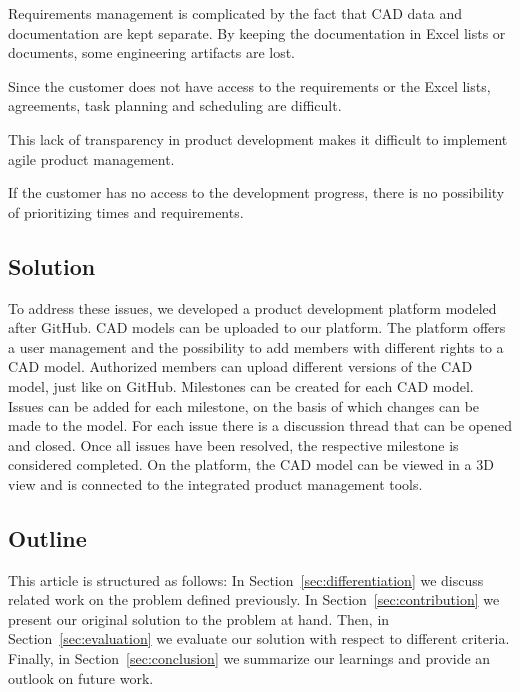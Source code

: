     Requirements management is complicated by the fact that CAD data and documentation are kept separate. By keeping the documentation in Excel lists or documents, some engineering artifacts are lost. 

    Since the customer does not have access to the requirements or the Excel lists, agreements, task planning and scheduling are difficult. 
    
    This lack of transparency in product development makes it difficult to implement agile product management.
    
    If the customer has no access to the development progress, there is no possibility of prioritizing times and requirements.
    
   

    \subsection*{Solution}

    To address these issues, we developed a product development platform modeled after GitHub. CAD models can be uploaded to our platform. The platform offers a user management and the possibility to add members with different rights to a CAD model. Authorized members can upload different versions of the CAD model, just like on GitHub. Milestones can be created for each CAD model. Issues can be added for each milestone, on the basis of which changes can be made to the model. For each issue there is a discussion thread that can be opened and closed. Once all issues have been resolved, the respective milestone is considered completed. On the platform, the CAD model can be viewed in a 3D view and is connected to the integrated product management tools. 

   

    \subsection*{Outline}
    This article is structured as follows:
    In Section~\ref{sec:differentiation} we discuss related work on the problem defined previously.
    In Section~\ref{sec:contribution} we present our original solution to the problem at hand.
    Then, in Section~\ref{sec:evaluation} we evaluate our solution with respect to different criteria.
    Finally, in Section~\ref{sec:conclusion} we summarize our learnings and provide an outlook on future work.
    
